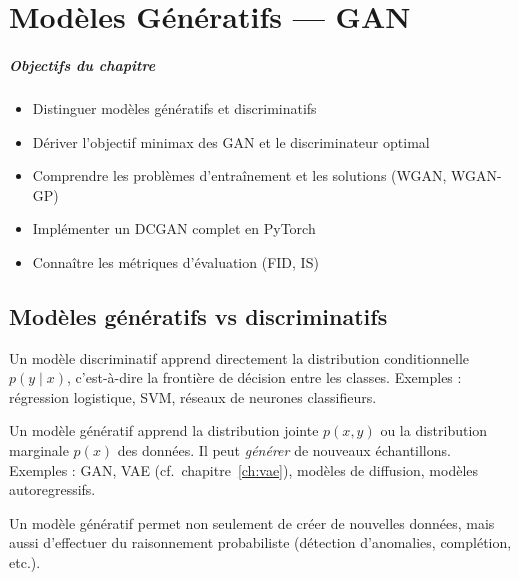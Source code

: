 \chapter{Mod\`eles G\'en\'eratifs --- GAN}
\label{ch:gan}

\paragraph{Objectifs du chapitre}
\begin{itemize}
\item Distinguer mod\`eles g\'en\'eratifs et discriminatifs
\item D\'eriver l'objectif minimax des GAN et le discriminateur optimal
\item Comprendre les probl\`emes d'entra\^inement et les solutions (WGAN, WGAN-GP)
\item Impl\'ementer un DCGAN complet en PyTorch
\item Conna\^itre les m\'etriques d'\'evaluation (FID, IS)
\end{itemize}

\section{Mod\`eles g\'en\'eratifs vs discriminatifs}
\label{sec:gen-vs-disc}

\begin{definition}
Un mod\`ele discriminatif apprend directement la distribution conditionnelle $p(y \mid x)$, c'est-\`a-dire la fronti\`ere de d\'ecision entre les classes. Exemples : r\'egression logistique, SVM, r\'eseaux de neurones classifieurs.
\end{definition}

\begin{definition}
Un mod\`ele g\'en\'eratif apprend la distribution jointe $p(x, y)$ ou la distribution marginale $p(x)$ des donn\'ees. Il peut \emph{g\'en\'erer} de nouveaux \'echantillons. Exemples : GAN, VAE (cf.\ chapitre~\ref{ch:vae}), mod\`eles de diffusion, mod\`eles autoregressifs.
\end{definition}

\begin{remarque}
Un mod\`ele g\'en\'eratif permet non seulement de cr\'eer de nouvelles donn\'ees, mais aussi d'effectuer du raisonnement probabiliste (d\'etection d'anomalies, compl\'etion, etc.).
\end{remarque}

